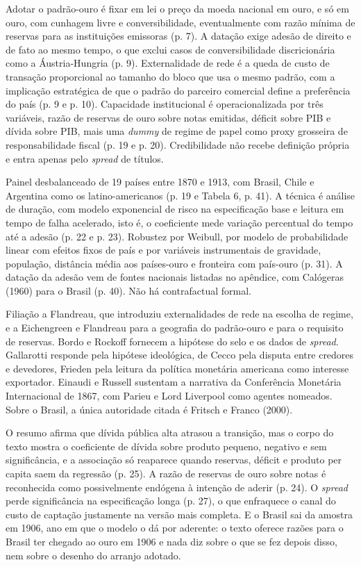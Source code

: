Adotar o padrão-ouro é fixar em lei o preço da moeda nacional em ouro, e só em
ouro, com cunhagem livre e conversibilidade, eventualmente com razão mínima de
reservas para as instituições emissoras (p. 7). A datação exige adesão de
direito e de fato ao mesmo tempo, o que exclui casos de conversibilidade
discricionária como a Áustria-Hungria (p. 9). Externalidade de rede é a queda
de custo de transação proporcional ao tamanho do bloco que usa o mesmo padrão,
com a implicação estratégica de que o padrão do parceiro comercial define a
preferência do país (p. 9 e p. 10). Capacidade institucional é operacionalizada
por três variáveis, razão de reservas de ouro sobre notas emitidas, déficit
sobre PIB e dívida sobre PIB, mais uma \emph{dummy} de regime de papel como
proxy grosseira de responsabilidade fiscal (p. 19 e p. 20). Credibilidade não
recebe definição própria e entra apenas pelo \emph{spread} de títulos.

Painel desbalanceado de 19 países entre 1870 e 1913, com Brasil, Chile e
Argentina como os latino-americanos (p. 19 e Tabela 6, p. 41). A técnica é
análise de duração, com modelo exponencial de risco na especificação base e
leitura em tempo de falha acelerado, isto é, o coeficiente mede variação
percentual do tempo até a adesão (p. 22 e p. 23). Robustez por Weibull, por
modelo de probabilidade linear com efeitos fixos de país e por variáveis
instrumentais de gravidade, população, distância média aos países-ouro e
fronteira com país-ouro (p. 31). A datação da adesão vem de fontes nacionais
listadas no apêndice, com Calógeras (1960) para o Brasil (p. 40). Não há
contrafactual formal.

Filiação a Flandreau, que introduziu externalidades de rede na escolha de
regime, e a Eichengreen e Flandreau para a geografia do padrão-ouro e para o
requisito de reservas. Bordo e Rockoff fornecem a hipótese do selo e os dados
de \emph{spread}. Gallarotti responde pela hipótese ideológica, de Cecco pela
disputa entre credores e devedores, Frieden pela leitura da política monetária
americana como interesse exportador. Einaudi e Russell sustentam a narrativa da
Conferência Monetária Internacional de 1867, com Parieu e Lord Liverpool como
agentes nomeados. Sobre o Brasil, a única autoridade citada é Fritsch e Franco
(2000).

O resumo afirma que dívida pública alta atrasou a transição, mas o corpo do
texto mostra o coeficiente de dívida sobre produto pequeno, negativo e sem
significância, e a associação só reaparece quando reservas, déficit e produto
per capita saem da regressão (p. 25). A razão de reservas de ouro sobre notas é
reconhecida como possivelmente endógena à intenção de aderir (p. 24). O
\emph{spread} perde significância na especificação longa (p. 27), o que
enfraquece o canal do custo de captação justamente na versão mais completa. E o
Brasil sai da amostra em 1906, ano em que o modelo o dá por aderente: o texto
oferece razões para o Brasil ter chegado ao ouro em 1906 e nada diz sobre o que
se fez depois disso, nem sobre o desenho do arranjo adotado.

